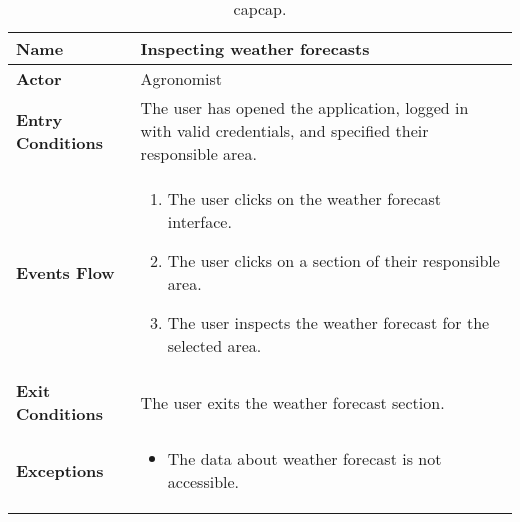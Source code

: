 \begin{table}[hbt!]
\centering
\caption{\label{tab:addOne{table_counter}}capcap.}
\renewcommand{\arraystretch}{1.25}
\begin{tabular}{|l|>{\raggedright\arraybackslash}m{12cm}|}
    \hline
    \textbf{Name} & Inspecting weather forecasts\\
    \hline
   	\textbf{Actor} & Agronomist\\
    \hline
    \textbf{Entry Conditions} & The user has opened the application, logged in with valid credentials, and specified their responsible area.\\    
    \hline
    \textbf{Events Flow} & 
    	\begin{enumerate}
            \item The user clicks on the weather forecast interface.
            \item The user clicks on a section of their responsible area.
            \item The user inspects the weather forecast for the selected area.
       \end{enumerate}\\
    \hline
    \textbf{Exit Conditions} & The user exits the weather forecast section.\\
    \hline
    \textbf{Exceptions} & 
    	\begin{itemize}
	    	\item The data about weather forecast is not accessible.
    	\end{itemize}\\
    \hline 
\end{tabular}
\end{table}
